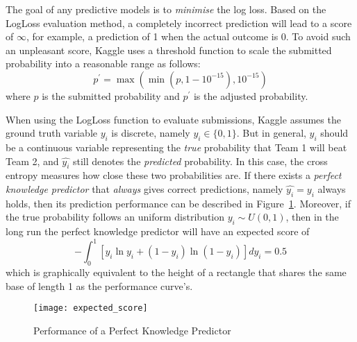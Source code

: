 The goal of any predictive models is to \emph{minimise} the log loss. Based on the LogLoss evaluation method, a completely incorrect prediction will lead to a score of $\infty$, for example, a prediction of 1 when the actual outcome is 0. To avoid such an unpleasant score, Kaggle uses a threshold function to scale the submitted probability into a reasonable range as follows: 
\begin{equation}
p^{\prime} = \max(\min(p, 1 - 10^{-15}), 10^{-15})
\end{equation}
where $p$ is the submitted probability and $p^{\prime}$ is the adjusted probability. 

When using the LogLoss function to evaluate submissions, Kaggle assumes the ground truth variable $y_{i}$ is discrete, namely $y_{i}\in\{0, 1\}$. But in general, $y_{i}$ should be a continuous variable representing the \emph{true} probability that Team 1 will beat Team 2, and $\hat{y_{i}}$ still denotes the \emph{predicted} probability. In this case, the cross entropy measures how close these two probabilities are. If there exists a \emph{perfect knowledge predictor} that \emph{always} gives correct predictions, namely $\hat{y_{i}} = y_{i}$ always holds, then its prediction performance can be described in Figure~\ref{Fig:perfm}. Moreover, if the true probability follows an uniform distribution $y_{i}\sim U(0, 1)$, then in the long run the perfect knowledge predictor will have an expected score of
\begin{equation}
-\int_{0}^{1}[y_{i}\ln{y_{i}} + (1 - y_{i})\ln(1 - y_{i})]dy_{i} = 0.5
\end{equation}
which is graphically equivalent to the height of a rectangle that shares the same base of length 1 as the performance curve's. 
\begin{figure}[h!]
\texttt{[image: expected\_score]}
\centering
\caption{Performance of a Perfect Knowledge Predictor}\label{Fig:perfm}
\end{figure}

